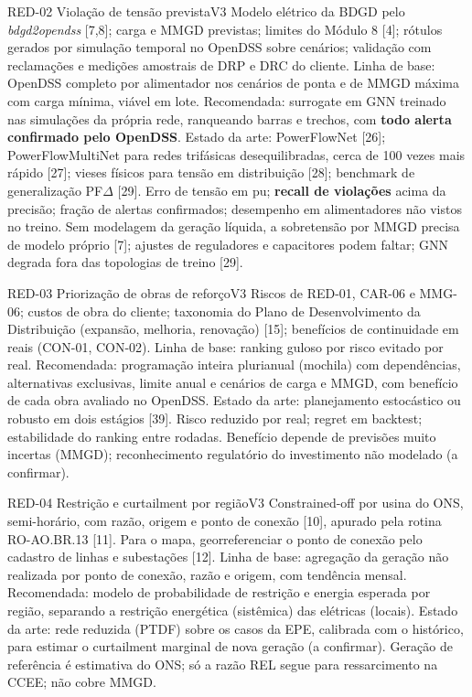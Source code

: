 \begin{ficha}{RED-02 \textperiodcentered{} Violação de tensão prevista}{V3}
 Modelo elétrico da BDGD pelo \emph{bdgd2opendss} [7,8]; carga
e MMGD previstas; limites do Módulo 8 [4]; rótulos gerados por simulação
temporal no OpenDSS sobre cenários; validação com reclamações e medições
amostrais de DRP e DRC do cliente.
 Linha de base: OpenDSS completo por alimentador nos
cenários de ponta e de MMGD máxima com carga mínima, viável em lote.
Recomendada: surrogate em GNN treinado nas simulações da própria rede,
ranqueando barras e trechos, com \textbf{todo alerta confirmado pelo OpenDSS}.
Estado da arte: PowerFlowNet [26]; PowerFlowMultiNet para redes trifásicas
desequilibradas, cerca de 100 vezes mais rápido [27]; vieses físicos para
tensão em distribuição [28]; benchmark de generalização PF$\Delta$ [29].
 Erro de tensão em pu; \textbf{recall de violações} acima da
precisão; fração de alertas confirmados; desempenho em alimentadores não
vistos no treino.
 Sem modelagem da geração líquida, a sobretensão por MMGD
precisa de modelo próprio [7]; ajustes de reguladores e capacitores podem
faltar; GNN degrada fora das topologias de treino [29].
\end{ficha}

\begin{ficha}{RED-03 \textperiodcentered{} Priorização de obras de reforço}{V3}
 Riscos de RED-01, CAR-06 e MMG-06; custos de obra do cliente;
taxonomia do Plano de Desenvolvimento da Distribuição (expansão, melhoria,
renovação) [15]; benefícios de continuidade em reais (CON-01, CON-02).
 Linha de base: ranking guloso por risco evitado por real.
Recomendada: programação inteira plurianual (mochila) com dependências,
alternativas exclusivas, limite anual e cenários de carga e MMGD, com
benefício de cada obra avaliado no OpenDSS. Estado da arte: planejamento
estocástico ou robusto em dois estágios [39].
 Risco reduzido por real; regret em backtest; estabilidade do
ranking entre rodadas.
 Benefício depende de previsões muito incertas (MMGD);
reconhecimento regulatório do investimento não modelado (a confirmar).
\end{ficha}

\begin{ficha}{RED-04 \textperiodcentered{} Restrição e curtailment por região}{V3}
 Constrained-off por usina do ONS, semi-horário, com razão,
origem e ponto de conexão [10], apurado pela rotina RO-AO.BR.13 [11]. Para o
mapa, georreferenciar o ponto de conexão pelo cadastro de linhas e
subestações [12].
 Linha de base: agregação da geração não realizada por
ponto de conexão, razão e origem, com tendência mensal. Recomendada: modelo
de probabilidade de restrição e energia esperada por região, separando a
restrição energética (sistêmica) das elétricas (locais). Estado da arte:
rede reduzida (PTDF) sobre os casos da EPE, calibrada com o histórico, para
estimar o curtailment marginal de nova geração (a confirmar).
 Geração de referência é estimativa do ONS; só a razão REL
segue para ressarcimento na CCEE; não cobre MMGD.
\end{ficha}

